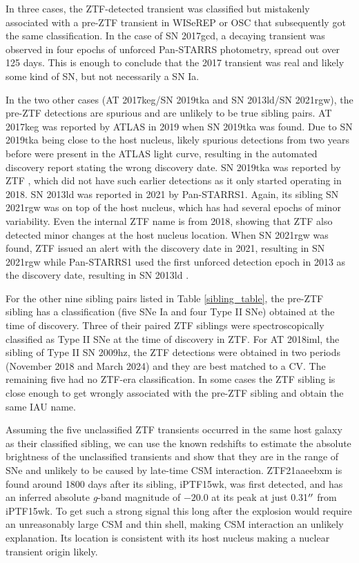 \documentclass[a4paper,oneside,12pt, class=Latex/Classes/PhDthesisPSnPDF, crop=false]{standalone}
\begin{document}
In three cases, the ZTF-detected transient was classified but mistakenly associated with a pre-ZTF transient in WISeREP or OSC that subsequently got the same classification. In the case of SN 2017gcd, a decaying transient was observed in four epochs of unforced Pan-STARRS photometry, spread out over 125 days. This is enough to conclude that the 2017 transient was real and likely some kind of SN, but not necessarily a SN Ia. 

In the two other cases (AT 2017keg/SN 2019tka and SN 2013ld/SN 2021rgw), the pre-ZTF detections are spurious and are unlikely to be true sibling pairs. AT 2017keg was reported by ATLAS in 2019 \citep{2017keg_disc} when SN 2019tka was found. Due to SN 2019tka being close to the host nucleus, likely spurious detections from two years before were present in the ATLAS light curve, resulting in the automated discovery report stating the wrong discovery date. SN 2019tka was reported by ZTF \citep{2019tka_disc}, which did not have such earlier detections as it only started operating in 2018. SN 2013ld was reported in 2021 by Pan-STARRS1. Again, its sibling SN 2021rgw was on top of the host nucleus, which has had several epochs of minor variability. Even the internal ZTF name is from 2018, showing that ZTF also detected minor changes at the host nucleus location. When SN 2021rgw was found, ZTF issued an alert with the discovery date in 2021, resulting in SN 2021rgw \citep{2021rgw_disc} while Pan-STARRS1 used the first unforced detection epoch in 2013 as the discovery date, resulting in SN 2013ld \citep{2013ld_disc}.

For the other nine sibling pairs listed in Table \ref{sibling_table}, the pre-ZTF sibling has a classification (five SNe Ia and four Type II SNe) obtained at the time of discovery.   Three of their paired ZTF siblings were spectroscopically classified as Type II SNe at the time of discovery in ZTF. For AT 2018iml, the sibling of Type II SN 2009hz, the ZTF detections were obtained in two periods (November 2018 and March 2024) and they are best matched to a CV. The remaining five had no ZTF-era classification. In some cases the ZTF sibling is close enough to get wrongly associated with the pre-ZTF sibling and obtain the same IAU name.

Assuming the five unclassified ZTF transients occurred in the same host galaxy as their classified sibling, we can use the known redshifts to estimate the absolute brightness of the unclassified transients and show that they are in the range of SNe and unlikely to be caused by late-time CSM interaction.
ZTF21aaeebxm is found around 1800 days after its sibling, iPTF15wk, was first detected, and has an inferred absolute \textit{g}-band magnitude of $-20.0$ at its peak at just 0.31$^{\prime\prime}$ from iPTF15wk. To get such a strong signal this long after the explosion would require an unreasonably large CSM and thin shell, making CSM interaction an unlikely explanation. Its location is consistent with its host nucleus making a nuclear transient origin likely.
\end{document}
